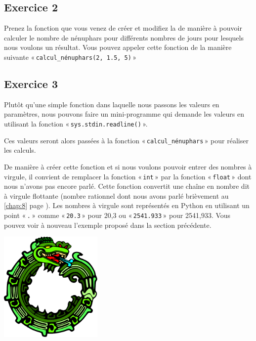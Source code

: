\subsection{Exercice 2}
Prenez la fonction que vous venez de créer et modifiez la de manière à pouvoir calculer le nombre de nénuphars pour différents nombres de jours pour lesquels nous voulons un résultat.
Vous pouvez appeler cette fonction de la manière suivante « \texttt{calcul\_nénuphars(2, 1.5, 5)} » 

\subsection{Exercice 3}
Plutôt qu'une simple fonction dans laquelle nous passons les valeurs en paramètres, nous pouvons faire un mini-programme qui demande les valeurs en utilisant la fonction « \texttt{sys.stdin.readline()} ».

Ces valeurs seront alors passées à la fonction « \texttt{calcul\_nénuphars} » pour réaliser les calculs.

De manière à créer cette fonction et si nous voulons pouvoir entrer des nombres à virgule, il convient de remplacer la fonction « \texttt{int} » par la fonction « \texttt{float} » dont nous n'avons pas encore parlé.
Cette fonction convertit une chaîne en nombre dit à virgule flottante (nombre rationnel dont nous avons parlé brièvement au \autoref{chap:8} page \pageref{chap:8}). Les nombres à virgule sont représentés en Python en utilisant un point « \texttt{.} » comme « \texttt{20.3} » pour 20,3 ou « \texttt{2541.933} »  pour 2541,933. Vous pouvez voir à nouveau l'exemple  proposé dans la section précédente.

 \vfill
\begin{center}
 \includegraphics[width=5cm]{images/ourochin.pdf}
\end{center}
 \vfill
 